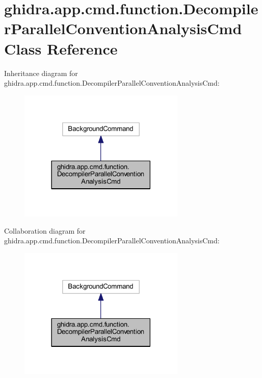 \hypertarget{classghidra_1_1app_1_1cmd_1_1function_1_1_decompiler_parallel_convention_analysis_cmd}{}\section{ghidra.\+app.\+cmd.\+function.\+Decompiler\+Parallel\+Convention\+Analysis\+Cmd Class Reference}
\label{classghidra_1_1app_1_1cmd_1_1function_1_1_decompiler_parallel_convention_analysis_cmd}


Inheritance diagram for ghidra.\+app.\+cmd.\+function.\+Decompiler\+Parallel\+Convention\+Analysis\+Cmd\+:
\nopagebreak
\begin{figure}[H]
\begin{center}
\leavevmode
\includegraphics[width=225pt]{classghidra_1_1app_1_1cmd_1_1function_1_1_decompiler_parallel_convention_analysis_cmd__inherit__graph}
\end{center}
\end{figure}


Collaboration diagram for ghidra.\+app.\+cmd.\+function.\+Decompiler\+Parallel\+Convention\+Analysis\+Cmd\+:
\nopagebreak
\begin{figure}[H]
\begin{center}
\leavevmode
\includegraphics[width=225pt]{classghidra_1_1app_1_1cmd_1_1function_1_1_decompiler_parallel_convention_analysis_cmd__coll__graph}
\end{center}
\end{figure}
